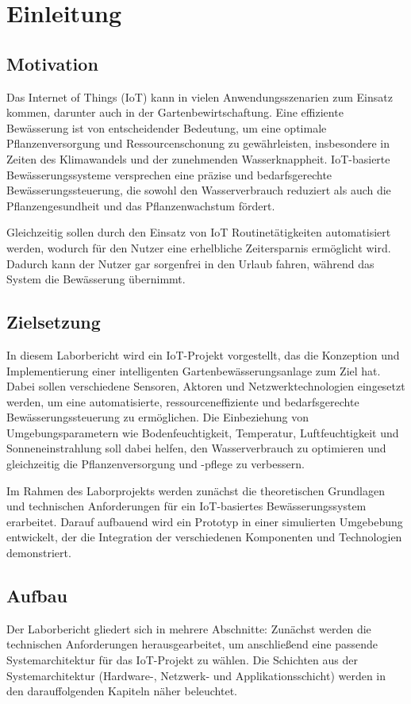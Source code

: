 
\section{Einleitung}

\subsection{Motivation}
Das Internet of Things (IoT) kann in vielen Anwendungsszenarien zum Einsatz kommen, darunter auch in der Gartenbewirtschaftung. Eine effiziente Bewässerung ist von entscheidender Bedeutung, um eine optimale Pflanzenversorgung und Ressourcenschonung zu gewährleisten, insbesondere in Zeiten des Klimawandels und der zunehmenden Wasserknappheit. IoT-basierte Bewässerungssysteme versprechen eine präzise und bedarfsgerechte Bewässerungssteuerung, die sowohl den Wasserverbrauch reduziert als auch die Pflanzengesundheit und das Pflanzenwachstum fördert.

Gleichzeitig sollen durch den Einsatz von IoT Routinetätigkeiten automatisiert werden, wodurch für den Nutzer eine erhelbliche Zeitersparnis ermöglicht wird.
Dadurch kann der Nutzer gar sorgenfrei in den Urlaub fahren, während das System die Bewässerung übernimmt.

\subsection{Zielsetzung}

In diesem Laborbericht wird ein IoT-Projekt vorgestellt, das die Konzeption und Implementierung einer intelligenten Gartenbewässerungsanlage zum Ziel hat. Dabei sollen verschiedene Sensoren, Aktoren und Netzwerktechnologien eingesetzt werden, um eine automatisierte, ressourceneffiziente und bedarfsgerechte Bewässerungssteuerung zu ermöglichen. Die Einbeziehung von Umgebungsparametern wie Bodenfeuchtigkeit, Temperatur, Luftfeuchtigkeit und Sonneneinstrahlung soll dabei helfen, den Wasserverbrauch zu optimieren und gleichzeitig die Pflanzenversorgung und -pflege zu verbessern.

Im Rahmen des Laborprojekts werden zunächst die theoretischen Grundlagen und technischen Anforderungen für ein IoT-basiertes Bewässerungssystem erarbeitet. Darauf aufbauend wird ein Prototyp in einer simulierten Umgebebung entwickelt, der die Integration der verschiedenen Komponenten und Technologien demonstriert. 

\subsection{Aufbau}

Der Laborbericht gliedert sich in mehrere Abschnitte: Zunächst werden die technischen Anforderungen herausgearbeitet, um anschließend eine passende Systemarchitektur für das IoT-Projekt zu wählen. 
Die Schichten aus der Systemarchitektur (Hardware-, Netzwerk- und Applikationsschicht) werden in den darauffolgenden Kapiteln näher beleuchtet.